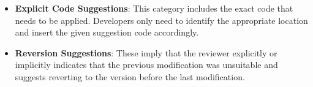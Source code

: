 \begin{itemize}[leftmargin=*,topsep=2pt]
    \item \textbf{Explicit Code Suggestions}: This category includes the exact code that needs to be applied. Developers only need to identify the appropriate location and insert the given suggestion code accordingly. 

    
    \item \textbf{Reversion Suggestions}: These imply that the reviewer explicitly or implicitly indicates that the previous modification was unsuitable and suggests reverting to the version before the last modification. 
    

\end{itemize}
